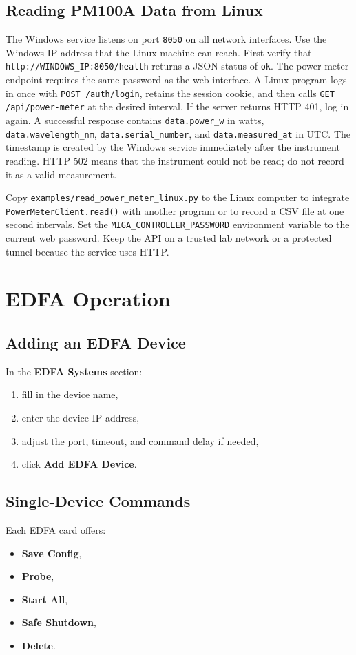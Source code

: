 \documentclass[11pt,a4paper]{article}
\begin{document}
\subsection{Reading PM100A Data from Linux}
The Windows service listens on port \texttt{8050} on all network interfaces. Use the
Windows IP address that the Linux machine can reach. First verify that
\texttt{http://WINDOWS\_IP:8050/health} returns a JSON status of \texttt{ok}.
The power meter endpoint requires the same password as the web interface.
A Linux program logs in once with \texttt{POST /auth/login}, retains the session cookie,
and then calls \texttt{GET /api/power-meter} at the desired interval. If the server
returns HTTP 401, log in again. A successful response contains \texttt{data.power\_w}
in watts, \texttt{data.wavelength\_nm}, \texttt{data.serial\_number}, and
\texttt{data.measured\_at} in UTC. The timestamp is created by the Windows service
immediately after the instrument reading. HTTP 502 means that the instrument could
not be read; do not record it as a valid measurement.

Copy \texttt{examples/read\_power\_meter\_linux.py} to the Linux computer to
integrate \texttt{PowerMeterClient.read()} with another program or to record a CSV
file at one second intervals. Set the \texttt{MIGA\_CONTROLLER\_PASSWORD} environment
variable to the current web password. Keep the API on a trusted lab network or a
protected tunnel because the service uses HTTP.

\section{EDFA Operation}
\subsection{Adding an EDFA Device}
In the \textbf{EDFA Systems} section:
\begin{enumerate}[leftmargin=1.5em]
    \item fill in the device name,
    \item enter the device IP address,
    \item adjust the port, timeout, and command delay if needed,
    \item click \textbf{Add EDFA Device}.
\end{enumerate}

\subsection{Single-Device Commands}
Each EDFA card offers:
\begin{itemize}[leftmargin=1.5em]
    \item \textbf{Save Config},
    \item \textbf{Probe},
    \item \textbf{Start All},
    \item \textbf{Safe Shutdown},
    \item \textbf{Delete}.
\end{itemize}
\end{document}
